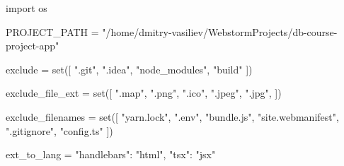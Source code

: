 \begin{pycode}
import os

PROJECT_PATH = "/home/dmitry-vasiliev/WebstormProjects/db-course-project-app"

exclude = set([
    ".git",
    ".idea",
    "node_modules",
    "build"
])

exclude_file_ext = set([
    ".map",
    ".png",
    ".ico",
    ".jpeg",
    ".jpg",
])

exclude_filenames = set([
    "yarn.lock",
    ".env",
    "bundle.js",
    "site.webmanifest",
    ".gitignore",
    "config.ts"
])

ext_to_lang = {
    "handlebars": "html",
    "tsx": "jsx"
}
\end{pycode}